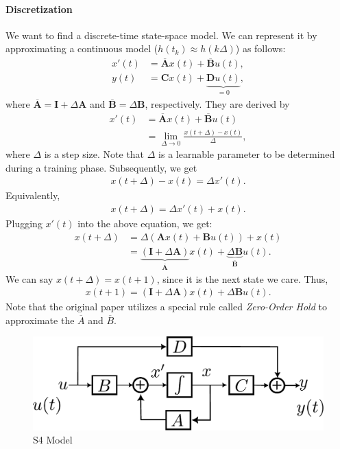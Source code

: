 \paragraph{Discretization} We want to find a discrete-time state-space model. We can represent it by approximating a continuous model (\ie $h(t_k) \approx h(k\Delta)$) as follows:
\begin{align*}
	x'(t) &= \overline{\mathbf{A}}x(t)+\overline{\mathbf{B}}u(t),\\
	y(t) &= \mathbf{C}x(t)+\underbrace{\mathbf{D}u(t)}_{=0},
\end{align*}
where $\overline{\mathbf{A}} = \mathbf{I}+\Delta \mathbf{A}$ and $\overline{\mathbf{B}} = \Delta \mathbf{B}$, respectively. They are derived by
\begin{align*}
	x'(t) &= \overline{\mathbf{A}}x(t)+\overline{\mathbf{B}}u(t)\\
		  &= \lim_{\Delta\to 0} \frac{x(t+\Delta)-x(t)}{\Delta},
\end{align*}
where $\Delta$ is a step size. Note that $\Delta$ is a learnable parameter to be determined during a training phase. Subsequently, we get 
\begin{align*}
	x(t+\Delta)-x(t) = \Delta x'(t).
\end{align*}
Equivalently, 
\begin{align*}
	x(t+\Delta) = \Delta x'(t)+x(t). 
\end{align*}
Plugging $x'(t)$ into the above equation, we get:
\begin{align*}
	x(t+\Delta) &= \Delta (\mathbf{A}x(t)+\mathbf{B}u(t)) +x(t) \\
				&= \underbrace{(\mathbf{I}+\Delta \mathbf{A})}_{\overline{\mathbf{A}}}x(t)+\underbrace{\Delta \mathbf{B}}_{\overline{\mathbf{B}}}u(t).
\end{align*}
We can say $x(t+\Delta)=x(t+1)$, since it is the next state we care. Thus, 
\begin{align*}
	x(t+1)= (\mathbf{I}+\Delta \mathbf{A})x(t)+\Delta \mathbf{B}u(t).
\end{align*}
Note that the original paper utilizes a special rule called \textit{Zero-Order Hold} to approximate the $\overline{A}$ and $\overline{B}$. 




\begin{figure}[h]
	\centering
	\includegraphics[scale=0.6]{./images/nlp/ssm.pdf}
	\caption{S4 Model}
	\label{fig:nlp_s4_model}
\end{figure}

